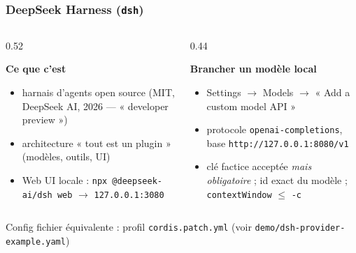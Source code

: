 \documentclass[
	11pt,
	aspectratio=169
]{beamer}
\begin{document}
\begin{frame}[fragile]
    \frametitle{DeepSeek Harness (\texttt{dsh})}
    \begin{columns}[t]
        \begin{column}{0.52\textwidth}
            \begin{block}{\centering \textbf{Ce que c'est}}
                \begin{itemize}\setlength\itemsep{0.3em}
                    \item harnais d'agents open source (MIT, DeepSeek AI, 2026 --- « developer preview »)
                    \item architecture « tout est un plugin » (modèles, outils, UI)
                    \item Web UI locale : \texttt{npx @deepseek-ai/dsh web} $\rightarrow$ \texttt{127.0.0.1:3080}
                \end{itemize}
            \end{block}
        \end{column}
        \begin{column}{0.44\textwidth}
            \begin{exampleblock}{\centering \textbf{Brancher un modèle local}}
                \begin{itemize}\setlength\itemsep{0.3em}
                    \item Settings $\rightarrow$ Models $\rightarrow$ « Add a custom model API »
                    \item protocole \texttt{openai-completions}, base \texttt{http://127.0.0.1:8080/v1}
                    \item clé factice acceptée \emph{mais obligatoire} ; id exact du modèle ; \texttt{contextWindow} $\leq$ \texttt{-c}
                \end{itemize}
            \end{exampleblock}
        \end{column}
    \end{columns}
    \vfill
    \small Config fichier équivalente : profil \texttt{cordis.patch.yml} (voir \texttt{demo/dsh-provider-example.yaml})
\end{frame}
\end{document}
